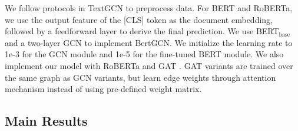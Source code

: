 \documentclass[11pt,a4paper]{article}
\begin{document}
We follow protocols in TextGCN to preprocess data. 
For BERT and RoBERTa, we use the output feature of the [CLS] token as the document embedding, followed by a feedforward layer to derive the final prediction. We use BERT$_\text{base}$ and a two-layer GCN to implement BertGCN. We initialize the learning rate to 1e-3 for the GCN module and 1e-5 for the fine-tuned BERT module. We also implement our model with RoBERTa and GAT \citep{velivckovic2017graph}. GAT variants are trained over the same graph as GCN variants, but learn edge weights through attention mechanism instead of using pre-defined weight matrix.

\subsection{Main Results}

\begin{table}
  \small
  \centering
  \caption{Results for different models on transductive text classification datasets. We run all models 10 times and report the mean test accuracy.}
  \label{tab:main}
\end{table}
\end{document}
